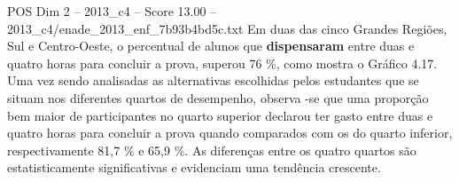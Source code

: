 \begin{textsample}{POS Dim 2 – 2013\_c4 – Score 13.00 – 2013\_c4/enade\_2013\_enf\_7b93b4bd5c.txt}
Em duas das cinco Grandes Regiões, Sul e Centro-Oeste, o percentual de alunos que \textbf{dispensaram} entre duas e quatro horas para concluir a prova, superou 76 \%, como mostra o Gráfico 4.17.
Uma vez sendo analisadas as alternativas escolhidas pelos estudantes que se situam nos diferentes quartos de desempenho, observa -se que uma proporção bem maior de participantes no quarto superior declarou ter gasto entre duas e quatro horas para concluir a prova quando comparados com os do quarto inferior, respectivamente 81,7 \% e 65,9 \%.
As diferenças entre os quatro quartos são estatisticamente significativas e evidenciam uma tendência crescente.

\end{textsample}
